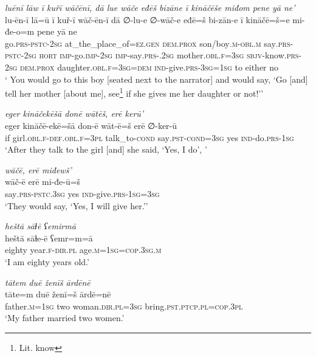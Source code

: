 \ea \label{ŽE.74}
\textit{luēnī lāw ī kuřī wāčēnī, dā lue wāče eđēš bizāne ī kināčēše miđom pene yā ne’} \\ 
\gll lu-ēn-ī lā=ū ī kuř-ī wāč-ēn-ī dā ∅-lu-e ∅-wāč-e eđē=š bi-zān-e ī kināčē=š=e mi-đe-o=m pene yā ne \\ 
 go\textsc{.prs}\textsc{-pstc}-\textsc{2sg} at\_the\_place\_of\textsc{\textsc{=ez.gen}} \textsc{dem.prox} son/boy\textsc{.m}\textsc{-obl}\textsc{.m} say\textsc{.prs}\textsc{-pstc}-\textsc{2sg} \textsc{hort} \textsc{imp-}go.\textsc{imp-}\textsc{2sg} \textsc{imp-}say\textsc{.prs-}.\textsc{2sg} mother\textsc{.obl}\textsc{.f}\textsc{=3sg} \textsc{sbjv-}know\textsc{.prs}-\textsc{2sg} \textsc{dem.prox} daughter\textsc{.obl}\textsc{.f}\textsc{=3sg}\textsc{=dem} \textsc{ind-}give\textsc{.prs}\textsc{-3sg}\textsc{=\textsc{1sg}} to either no \\ 
\glt ` You would go to this boy [seated next to the narrator] and would say, ‘Go [and] tell her mother [about me], see\footnote{Lit. know} if she gives me her daughter or not!’'
\z 
 
\ea \label{ŽE.77}
\textit{eger kināčekēšā donē wātēš, erē kerū’} \\ 
\gll eger kināčē-ekē=šā don-ē wāt-ē=š erē ∅-ker-ū \\ 
 if girl\textsc{.obl}\textsc{.f}\textsc{-def}\textsc{.obl}\textsc{.f}\textsc{=3pl} talk\_to\textsc{-cond} say\textsc{.pst}\textsc{-cond}\textsc{=3sg} yes \textsc{ind-}do\textsc{.prs}\textsc{-\textsc{1sg}} \\ 
\glt `After they talk to the girl [and] she said, ‘Yes, I do’, '
\z 
 
\ea \label{ŽE.81}
\textit{wāčē, erē miđewš’} \\ 
\gll wāč-ē erē mi-đe-ū=š \\ 
 say\textsc{.prs-pstc}\textsc{.3sg} yes \textsc{ind-}give\textsc{.prs}\textsc{-\textsc{1sg}}\textsc{=3sg} \\ 
\glt `They would say, ‘Yes, I will give her.’'
\z 
 
\ea \label{ŽM.1}
\textit{heštā sāɫē ʕemirmā} \\ 
\gll heštā sāɫe-ē ʕemr=m=ā \\ 
 eighty year\textsc{.f}\textsc{-dir}\textsc{.pl} age\textsc{.m}\textsc{=\textsc{1sg}}\textsc{=cop}\textsc{.3sg}\textsc{.m} \\ 
\glt `I am eighty years old.'
\z 
 
\ea \label{ŽM.2}
\textit{tātem duē ženīš ārdēnē} \\ 
\gll tāte=m duē ženī=š ārdē=nē \\ 
 father\textsc{.m}\textsc{=\textsc{1sg}} two woman\textsc{.dir}\textsc{.pl}\textsc{=3sg} bring\textsc{.pst}\textsc{.ptcp}\textsc{.pl}\textsc{=cop}\textsc{.3pl} \\ 
\glt `My father married two women.'
\z 
 
